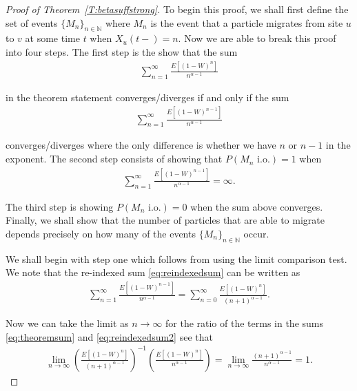 \documentclass[11pt]{article}
\theoremstyle{definition}
\newcommand{\N}{\mathbb{N}}
\newcommand{\thmref}[1]{Theorem~\ref{T:#1}}
\begin{document}
\begin{proof}[Proof of \thmref{betasuffstrong}]
    To begin this proof, we shall first define the set of events $\{M_n\}_{n \in \N}$ where $M_n$ is the event that a particle migrates from site $u$ to $v$ at some time $t$ when $X_u(t-) = n$. Now we are able to break this proof into four steps. The first step is the show that the sum 
    \begin{align}\label{eq:theoremsum}
        \sum_{n=1}^\infty \frac{E[(1-W)^{n}]}{n^{\alpha-1}}
    \end{align}

    \noindent in the theorem statement converges/diverges if and only if the sum
    \begin{align}\label{eq:reindexedsum}
        \sum_{n=1}^\infty \frac{E[(1-W)^{n-1}]}{n^{\alpha-1}}
    \end{align}
    
    \noindent converges/diverges where the only difference is whether we have $n$ or $n-1$ in the exponent. The second step consists of showing that $P(M_n \text{ i.o.}) = 1$ when
    \begin{align*}
        \sum_{n=1}^\infty \frac{E[(1-W)^{n-1}]}{n^{\alpha-1}} = \infty.
    \end{align*}

    \noindent The third step is showing $P(M_n \text{ i.o.}) = 0$ when the sum above converges. Finally, we shall show that the number of particles that are able to migrate depends precisely on how many of the events $\{M_n\}_{n \in \N}$ occur.
    \medskip

    \noindent We shall begin with step one which follows from using the limit comparison test. We note that the re-indexed sum \eqref{eq:reindexedsum} can be written as
    \begin{align}\label{eq:reindexedsum2}
        \sum_{n=1}^\infty \frac{E[(1-W)^{n-1}]}{n^{\alpha-1}} = \sum_{n = 0}^\infty \frac{E[(1-W)^n]}{(n+1)^{\alpha-1}}.
    \end{align}

    \noindent Now we can take the limit as $n \to \infty$ for the ratio of the terms in the sums \eqref{eq:theoremsum} and \eqref{eq:reindexedsum2} see that
    \begin{align*}
        \lim_{n \to \infty} \left( \frac{E[(1-W)^n]}{(n+1)^{\alpha-1}}\right)^{-1} \left( \frac{E[(1-W)^n]}{n^{\alpha-1}}\right) = \lim_{n \to \infty} \frac{(n+1)^{\alpha-1}}{n^{\alpha - 1}} = 1.
    \end{align*}


\end{proof}
\end{document}
